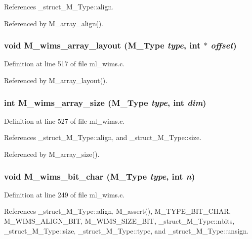 References \_\-struct\_\-M\_\-Type::align.

Referenced by M\_\-array\_\-align().
\subsubsection{\setlength{\rightskip}{0pt plus 5cm}void M\_\-wims\_\-array\_\-layout (\bf{M\_\-Type} {\em type}, int $\ast$ {\em offset})}\label{m__wims_8h_61439c16abd828917d3676fc9b64546b}




Definition at line 517 of file ml\_\-wims.c.

Referenced by M\_\-array\_\-layout().
\subsubsection{\setlength{\rightskip}{0pt plus 5cm}int M\_\-wims\_\-array\_\-size (\bf{M\_\-Type} {\em type}, int {\em dim})}\label{m__wims_8h_26f3f696afa4b7e4baae4c32ff22e42d}




Definition at line 527 of file ml\_\-wims.c.

References \_\-struct\_\-M\_\-Type::align, and \_\-struct\_\-M\_\-Type::size.

Referenced by M\_\-array\_\-size().
\subsubsection{\setlength{\rightskip}{0pt plus 5cm}void M\_\-wims\_\-bit\_\-char (\bf{M\_\-Type} {\em type}, int {\em n})}\label{m__wims_8h_e1b404e7db639f47814075359cdee0de}




Definition at line 249 of file ml\_\-wims.c.

References \_\-struct\_\-M\_\-Type::align, M\_\-assert(), M\_\-TYPE\_\-BIT\_\-CHAR, M\_\-WIMS\_\-ALIGN\_\-BIT, M\_\-WIMS\_\-SIZE\_\-BIT, \_\-struct\_\-M\_\-Type::nbits, \_\-struct\_\-M\_\-Type::size, \_\-struct\_\-M\_\-Type::type, and \_\-struct\_\-M\_\-Type::unsign.

